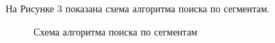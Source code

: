 \documentclass[14pt, a4paper]{extarticle}
\begin{document}
	На Рисунке 3 показана схема алгоритма поиска по сегментам.
	\begin{figure}[h!]
		\caption{Схема алгоритма поиска по сегментам}
	\end{figure}
	\clearpage
	
\end{document}
